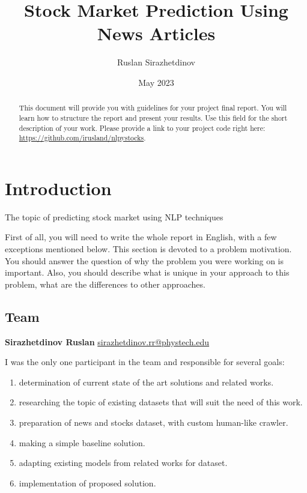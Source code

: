 \documentclass{article}
\title{Stock Market Prediction Using News Articles}
\author{Ruslan Sirazhetdinov}
\date{May 2023}
\begin{document}
\maketitle
\begin{abstract}
    
    
    This document will provide you with guidelines for your project final report. You will learn how to structure the report and present your results. Use this field for the short description of your work. Please provide a link to your project code right here: \url{https://github.com/irusland/nlpystocks}.
\end{abstract}



\section{Introduction}
The topic of predicting stock market using NLP techniques 


First of all, you will need to write the whole report in English, with a few exceptions mentioned below.
This section is devoted to a problem motivation. You should answer the question of why the problem you were working on is important. Also, you should describe what is unique in your approach to this problem, what are the differences to other approaches.
\subsection{Team}
\textbf{Sirazhetdinov Ruslan} \href{mailto:sirazhetdinov.rr@phystech.edu}{sirazhetdinov.rr@phystech.edu}

I was the only one participant in the team and responsible for several goals:

\begin{enumerate}
  \item  determination of current state of the art solutions and related works.
  \item  researching the topic of existing datasets that will suit the need of this work.
  \item  preparation of news and stocks dataset, with custom human-like crawler.
  \item  making a simple baseline solution.
  \item  adapting existing models from related works for dataset.
  \item  implementation of proposed solution.
  
\end{enumerate}
\end{document}
